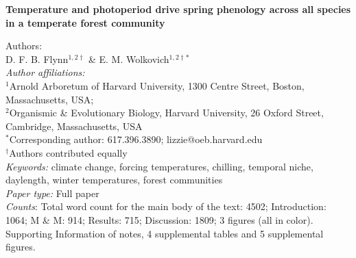 \documentclass[11pt]{article}
\begin{document}
 
  
\noindent \textbf{\large{Temperature and photoperiod drive spring phenology across all species in a temperate forest community}}


\noindent Authors:\\
D. F. B. Flynn$^{1,2\dagger}$ \& E. M. Wolkovich$^{1,2\dagger *}$
\vspace{2ex}\\
\emph{Author affiliations:}\\
$^{1}$Arnold Arboretum of Harvard University, 1300 Centre Street, Boston, Massachusetts, USA; \\
$^{2}$Organismic \& Evolutionary Biology, Harvard University, 26 Oxford Street, Cambridge, Massachusetts, USA
\vspace{2ex}\\
$^*$Corresponding author: 617.396.3890; lizzie@oeb.harvard.edu\\
$^\dagger$Authors contributed equally\\

\noindent \emph{Keywords:} climate change, forcing temperatures, chilling, temporal niche, daylength, winter temperatures, forest communities\\ %
\emph{Paper type:} Full paper\\
 \emph{Counts}: Total word count for the main body of the text:  4502; Introduction: 1064; M \& M: 914; Results: 715; Discussion: 1809; 3 figures (all in color). Supporting Information of notes, 4 supplemental tables and 5 supplemental figures.\\



\end{document}
